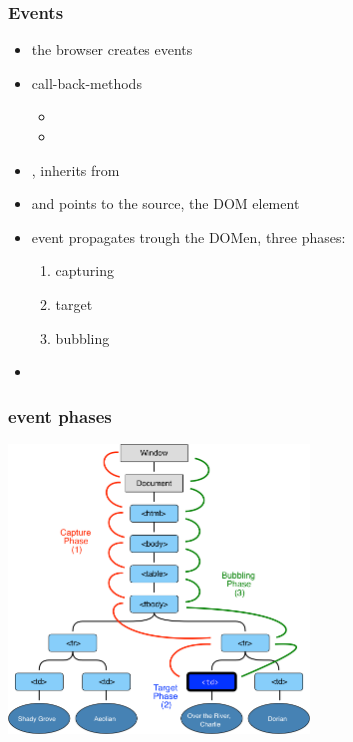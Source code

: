 \begin{frame}[fragile]
\frametitle{Events}
\color{structure}

\begin{itemize}\color{structure}
\item the browser creates events 
\item call-back-methods
\begin{itemize}
  \item {}
  \item {}
\end{itemize}
\item {},  inherits from 
\item {} and  points to the source, the DOM element
\item event propagates trough the DOMen, three phases:
  \begin{enumerate}
    \item capturing
    \item target
    \item bubbling
  \end{enumerate}
\item {}
\end{itemize}

\end{frame}

\begin{frame}[fragile]
\frametitle{event phases}
\color{structure}
  \centering
  \includegraphics[width=8cm]{img/eventflow}

\end{frame}


